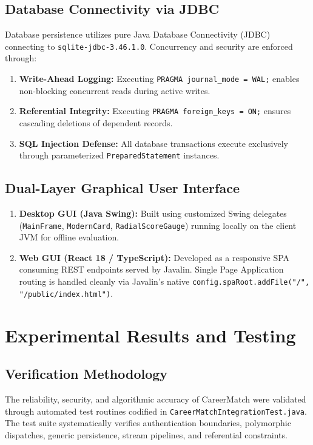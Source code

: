 \documentclass[11pt,a4paper]{report}
\begin{document}
\section{Database Connectivity via JDBC}
Database persistence utilizes pure Java Database Connectivity (JDBC) connecting to \texttt{sqlite-jdbc-3.46.1.0}. Concurrency and security are enforced through:
\begin{enumerate}
    \item \textbf{Write-Ahead Logging:} Executing \texttt{PRAGMA journal\_mode = WAL;} enables non-blocking concurrent reads during active writes.
    \item \textbf{Referential Integrity:} Executing \texttt{PRAGMA foreign\_keys = ON;} ensures cascading deletions of dependent records.
    \item \textbf{SQL Injection Defense:} All database transactions execute exclusively through parameterized \texttt{PreparedStatement} instances.
\end{enumerate}

\section{Dual-Layer Graphical User Interface}
\begin{enumerate}
    \item \textbf{Desktop GUI (Java Swing):} Built using customized Swing delegates (\texttt{MainFrame}, \texttt{ModernCard}, \texttt{RadialScoreGauge}) running locally on the client JVM for offline evaluation.
    \item \textbf{Web GUI (React 18 / TypeScript):} Developed as a responsive SPA consuming REST endpoints served by Javalin. Single Page Application routing is handled cleanly via Javalin's native \texttt{config.spaRoot.addFile("/", "/public/index.html")}.
\end{enumerate}

\chapter{Experimental Results and Testing}

\section{Verification Methodology}
The reliability, security, and algorithmic accuracy of CareerMatch were validated through automated test routines codified in \texttt{CareerMatchIntegrationTest.java}. The test suite systematically verifies authentication boundaries, polymorphic dispatches, generic persistence, stream pipelines, and referential constraints.
\end{document}
